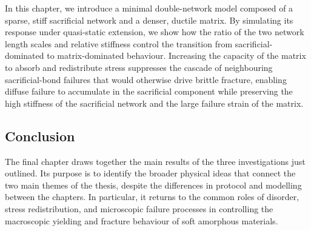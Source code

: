 In this chapter, we introduce a minimal double-network model composed of a sparse, stiff sacrificial network and a denser, ductile matrix. By simulating its response under quasi-static extension, we show how the ratio of the two network length scales and relative stiffness control the transition from sacrificial-dominated to matrix-dominated behaviour. Increasing the capacity of the matrix to absorb and redistribute stress suppresses the cascade of neighbouring sacrificial-bond failures that would otherwise drive brittle fracture, enabling diffuse failure to accumulate in the sacrificial component while preserving the high stiffness of the sacrificial network and the large failure strain of the matrix. 

\subsection*{Conclusion}
The final chapter draws together the main results of the three investigations just outlined. Its purpose is to identify the broader physical ideas that connect the two main themes of the thesis, despite the differences in protocol and modelling between the chapters. In particular, it returns to the common roles of disorder, stress redistribution, and microscopic failure processes in controlling the macroscopic yielding and fracture behaviour of soft amorphous materials.
